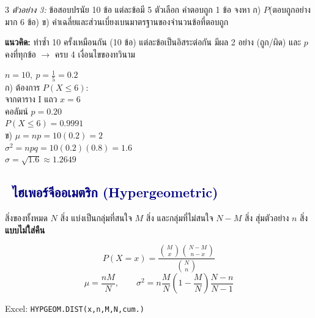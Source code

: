 \documentclass[9pt]{extarticle}
\newcommand{\dist}[1]{\subsection*{\textcolor{navy}{\textbullet\ #1}}}
\begin{document}
\begin{multicols}{3}
\textit{ตัวอย่าง 3:} ข้อสอบปรนัย 10 ข้อ แต่ละข้อมี 5 ตัวเลือก คำตอบถูก 1 ข้อ จงหา ก) $P$(ตอบถูกอย่างมาก 6 ข้อ) ข) ค่าเฉลี่ย\allowbreak และส่วนเบี่ยงเบน\allowbreak มาตรฐานของ\allowbreak จำนวนข้อที่ตอบถูก
\begin{ideabox}
\textbf{แนวคิด:} ทำซ้ำ 10 ครั้ง\allowbreak เหมือนกัน (10 ข้อ) แต่ละข้อ\allowbreak เป็นอิสระต่อกัน มีผล 2 อย่าง (ถูก/ผิด) และ $p$ คงที่\allowbreak ทุกข้อ $\to$ ครบ 4 เงื่อนไข\allowbreak ของทวินาม
\end{ideabox}
\begin{solbox}
$n=10,\ p=\frac15=0.2$\\
ก) ต้องการ $P(X\le6)$:\\ จากตาราง I แถว $x{=}6$\\ คอลัมน์ $p{=}0.20$\\
$P(X\le6)=0.9991$\\
ข) $\mu=np=10(0.2)=2$\\
$\sigma^2=npq=10(0.2)(0.8)=1.6$\\
$\sigma=\sqrt{1.6}\approx1.2649$
\end{solbox}

\begin{center}
\end{center}

\dist{ไฮเพอร์จีออเมตริก (Hypergeometric)}
สิ่งของทั้งหมด $N$ สิ่ง แบ่งเป็นกลุ่มที่สนใจ $M$ สิ่ง และกลุ่มที่ไม่สนใจ $N{-}M$ สิ่ง สุ่มตัวอย่าง $n$ สิ่ง \textbf{แบบไม่ใส่คืน}
\begin{formulabox}
$$P(X{=}x)=\dfrac{\binom{M}{x}\binom{N-M}{n-x}}{\binom{N}{n}}$$
$$\mu = \dfrac{nM}{N}, \qquad \sigma^2 = n\dfrac{M}{N}\left(1-\dfrac{M}{N}\right)\dfrac{N-n}{N-1}$$
\end{formulabox}
Excel: \texttt{HYPGEOM.DIST(x,n,M,N,cum.)}


\end{multicols}
\end{document}
